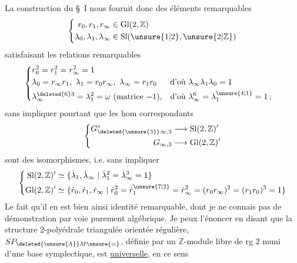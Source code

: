 La construction du \S~I nous fournit donc des éléments remarquables
\[
\left\{\begin{aligned}
r_0,r_1,r_\infty&\in\mathrm{Gl}(2,\mathbb Z)\\
\lambda_0,\lambda_1,\lambda_\infty&\in\mathrm{Sl}(\unsure{1|2},\unsure{2|\mathbb Z})
\end{aligned}\right.
\]
satisfaisant les relations remarquables
\[
\left\{\begin{aligned}
&r_0^2=r_1^2=r_\infty^2=1\\
&\lambda_0=r_\infty r_1,\ \lambda_1=r_0r_\infty,\ \lambda_\infty=r_1r_0
&&\text{d'où }\lambda_\infty\lambda_1\lambda_0=1\\
&\lambda_\infty^{\deleted{6}3}=\lambda_1^2=\omega\ \text{(matrice $-1$)},&&\text{d'où }\lambda_\infty^6=\lambda_1^{\unsure{4|1}}=1\,;
\end{aligned}\right.
\]
sans impliquer pourtant que les hom correspondants
\[
\left\{\begin{aligned}
G^\circ_{\deleted{\unsure{3}}\infty,3}&\longrightarrow\mathrm{Sl}(2,\mathbb Z)'\\
G_{\infty,3}&\longrightarrow\mathrm{Gl}(2,\mathbb Z)'
\end{aligned}\right.
\]
sont des isomorphismes, i.e. sans impliquer
\[
\left\{\begin{aligned}
\mathrm{Sl}(2,\mathbb Z)'&\simeq\{\dot{\lambda}_1,\dot{\lambda}_\infty\mid\dot{\lambda}_1^2=\dot{\lambda}_\infty^3=1\}\\
\mathrm{Gl}(2,\mathbb Z)'&\simeq\{\dot{r}_0,\dot{r}_1,\dot{r}_\infty\mid
\dot{r}_0^2=\dot{r}_1^{\unsure{7|2}}=\dot{r}_\infty^2=(r_0r_\infty)^2=(r_1r_0)^3=1\}
\end{aligned}\right.
\]
Le fait qu'il en est bien ainsi  identité remarquable, dont je ne connais pas de démonstration par voie purement algébrique. Je peux l'énoncer en disant que la structure 2-polyédrale triangulée orientée régulière,  $SP_{\deleted{\unsure{\Lambda}}M\unsure{=}}$, définie par un $\mathbb Z$-module  libre de rg 2 muni d'une base symplectique, est \uline{universelle}, en ce sens
